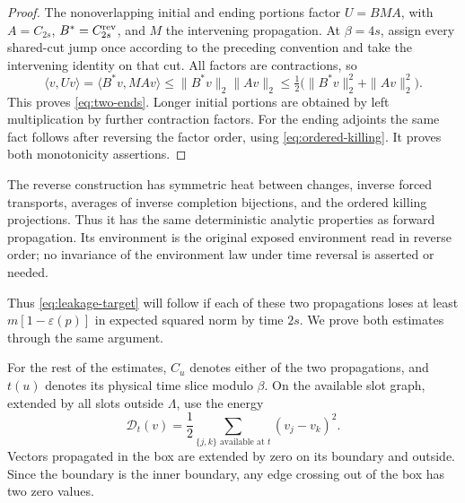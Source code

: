 \begin{proof}
The nonoverlapping initial and ending portions factor $U=BMA$, with
$A=C_{2s}$, $B^*=C_{2s}^{\rm rev}$, and $M$ the intervening
propagation.  At $\beta=4s$, assign every shared-cut jump once according
to the preceding convention and take the intervening identity on that
cut.  All factors are contractions, so
\[
 \langle v,Uv\rangle
 =\langle B^*v,MAv\rangle
 \le\|B^*v\|_2\|Av\|_2
 \le\tfrac12\bigl(\|B^*v\|_2^2+\|Av\|_2^2\bigr).
\]
This proves \eqref{eq:two-ends}.  Longer initial portions are obtained
by left multiplication by further contraction factors.  For the ending
adjoints the same fact follows after reversing the factor order, using
\eqref{eq:ordered-killing}.  It proves both monotonicity assertions.
\end{proof}

The reverse construction has symmetric heat between changes, inverse
forced transports, averages of inverse completion bijections, and the
ordered killing projections.  Thus it has the same deterministic
analytic properties as forward propagation.  Its environment is the
original exposed environment read in reverse order; no invariance of
the environment law under time reversal is asserted or needed.

Thus \eqref{eq:leakage-target} will follow if each of these two
propagations loses at least $m[1-\varepsilon(p)]$ in expected squared
norm by time $2s$.  We prove both estimates through the same argument.

For the rest of the estimates, $C_u$ denotes either of the two
propagations, and $t(u)$ denotes its physical time slice modulo $\beta$.
On the available slot graph, extended by all slots outside $\Lambda$,
use the energy
\[
 \mathcal D_{t}(v)=\frac12\sum_{\{j,k\}\text{ available at }t}
                          (v_j-v_k)^2.
\]
Vectors propagated in the box are extended by zero on its boundary and
outside.  Since the boundary is the inner boundary, any edge crossing
out of the box has two zero values.

